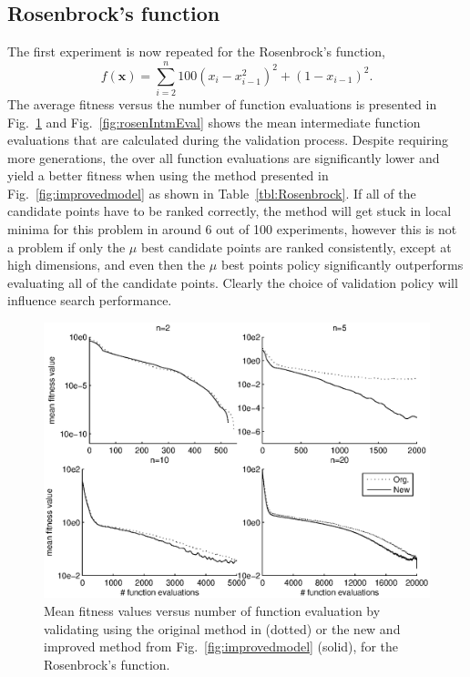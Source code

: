 \documentclass[conference]{IEEEtran}
\renewcommand{\vec}[1]{{\mbox{\boldmath$#1$}}}
\renewcommand{\vec}[1]{{\mathbf #1}}
\begin{document}
\subsection{Rosenbrock's function}\label{sec:rosen}
The first experiment is now repeated for the Rosenbrock's function, 
\begin{equation}f(\vec{x}) = \sum_{i=2}^n 100(x_{i}-x_{i-1}^2)^2 + (1-x_{i-1})^2.\end{equation}
The average fitness versus the number of function evaluations is presented in Fig.~\ref{fig:rosenFitness} and Fig.~\ref{fig:rosenIntmEval} shows the mean intermediate function evaluations that are calculated during the validation process. Despite requiring more generations, the over all function evaluations are significantly lower and yield a better fitness when using the method presented in Fig.~\ref{fig:improvedmodel} as shown in Table~\ref{tbl:Rosenbrock}. If all of the candidate points have to be ranked correctly, the method will get stuck in local minima for this problem in around 6 out of 100 experiments, however this is not a problem if only the $\mu$ best candidate points are ranked consistently, except at high dimensions, and even then the $\mu$ best points policy significantly outperforms evaluating all of the candidate points. Clearly the choice of validation policy will influence search performance. 
\begin{figure}[b!]
\centering
\includegraphics[trim = 10mm 10mm 10mm 5mm, clip, width=0.99\columnwidth]{figs/rosen_meanFitness_funcEval.eps}
\caption{Mean fitness values versus number of function evaluation by validating using the original method in \cite{Ru06:PPSN} (dotted) or the new and improved method from Fig.~\ref{fig:improvedmodel} (solid), for the Rosenbrock's function.}
\label{fig:rosenFitness}
\end{figure}
\end{document}
